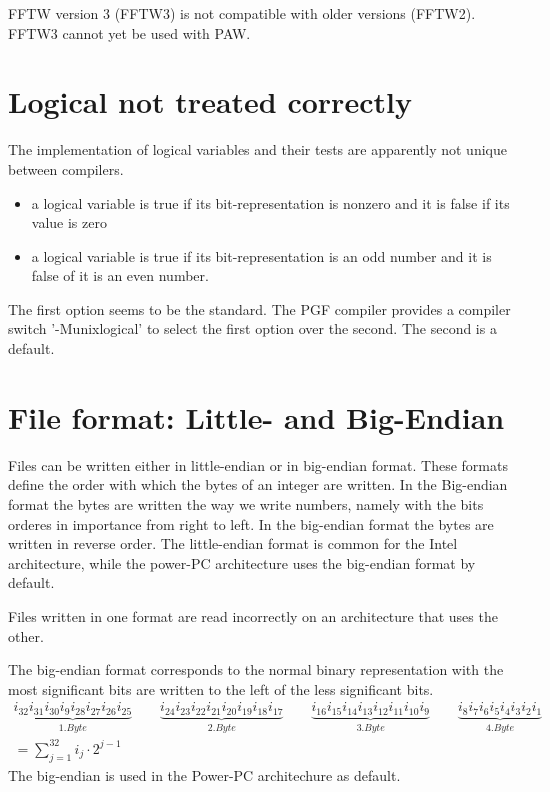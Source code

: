 \documentclass[a4paper,10pt]{report}
\begin{document}
FFTW version 3 (FFTW3) is not compatible with older versions
(FFTW2). FFTW3 cannot yet be used with PAW.

\section{Logical not treated correctly}
The implementation of logical variables and their tests are apparently
not unique between compilers. 
\begin{itemize}
\item a logical variable is true if its bit-representation is nonzero
and it is false if its value is zero
\item a logical variable is true if its bit-representation is an odd
number and it is false of it is an even number.
\end{itemize}
The first option seems to be the standard.  The PGF compiler provides
a compiler switch '-Munixlogical' to select the first option over the
second. The second is a default.

\section{File format: Little- and Big-Endian}
Files can be written either in little-endian or in big-endian
format. These formats define the order with which the bytes of an
integer are written. In the Big-endian format the bytes are written
the way we write numbers, namely with the bits orderes in importance
from right to left. In the big-endian format the bytes are written in
reverse order. The little-endian format is common for the Intel
architecture, while the power-PC architecture uses the big-endian
format by default.

Files written in one format are read incorrectly on an architecture
that uses the other.

The big-endian format corresponds to the normal binary representation
with the most significant bits are written to the left of the less
significant bits.
\begin{eqnarray}
\underbrace{i_{32}i_{31}i_{30}i_{9}i_{28}i_{27}i_{26}i_{25}}_{1.Byte}
\qquad
\underbrace{i_{24}i_{23}i_{22}i_{21}i_{20}i_{19}i_{18}i_{17}}_{2. Byte}
\qquad
\underbrace{i_{16}i_{15}i_{14}i_{13}i_{12}i_{11}i_{10}i_{9}}_{3. Byte}
\qquad
\underbrace{i_{8}i_{7}i_{6}i_{5}i_{4}i_{3}i_{2}i_{1}}_{4. Byte}
\\
=\sum_{j=1}^{32} i_j\cdot 2^{j-1}
\end{eqnarray}
The big-endian is used in the Power-PC architechure as default.
\end{document}
